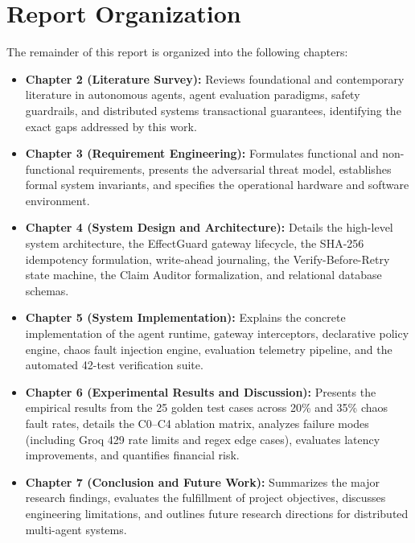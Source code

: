 \section{Report Organization}
\label{sec:intro_organization}
The remainder of this report is organized into the following chapters:
\begin{itemize}
    \item \textbf{Chapter 2 (Literature Survey):} Reviews foundational and contemporary literature in autonomous agents, agent evaluation paradigms, safety guardrails, and distributed systems transactional guarantees, identifying the exact gaps addressed by this work.
    \item \textbf{Chapter 3 (Requirement Engineering):} Formulates functional and non-functional requirements, presents the adversarial threat model, establishes formal system invariants, and specifies the operational hardware and software environment.
    \item \textbf{Chapter 4 (System Design and Architecture):} Details the high-level system architecture, the EffectGuard gateway lifecycle, the SHA-256 idempotency formulation, write-ahead journaling, the Verify-Before-Retry state machine, the Claim Auditor formalization, and relational database schemas.
    \item \textbf{Chapter 5 (System Implementation):} Explains the concrete implementation of the agent runtime, gateway interceptors, declarative policy engine, chaos fault injection engine, evaluation telemetry pipeline, and the automated 42-test verification suite.
    \item \textbf{Chapter 6 (Experimental Results and Discussion):} Presents the empirical results from the 25 golden test cases across 20\% and 35\% chaos fault rates, details the C0–C4 ablation matrix, analyzes failure modes (including Groq 429 rate limits and regex edge cases), evaluates latency improvements, and quantifies financial risk.
    \item \textbf{Chapter 7 (Conclusion and Future Work):} Summarizes the major research findings, evaluates the fulfillment of project objectives, discusses engineering limitations, and outlines future research directions for distributed multi-agent systems.
\end{itemize}
